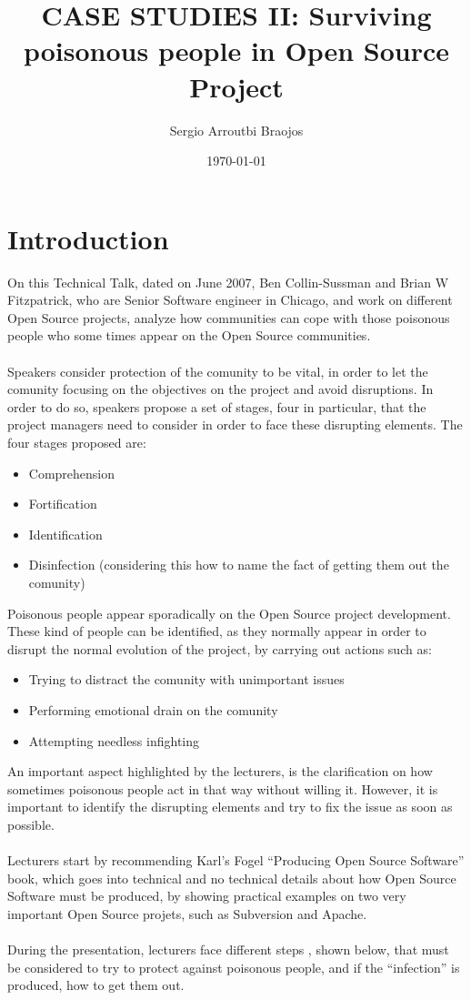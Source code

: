 \documentclass[11pt]{article}
\title{\textbf{CASE STUDIES II: Surviving poisonous people in Open Source Project}}
\author{Sergio Arroutbi Braojos}
\date{\today}
\begin{document}
\maketitle

\section{Introduction}
On this Technical Talk, dated on June 2007, Ben Collin-Sussman and Brian W Fitzpatrick, who are Senior Software engineer in Chicago, and work on different Open Source projects, analyze how communities can cope with those poisonous people who some times appear on the Open Source communities.\\
\\
Speakers consider protection of the comunity to be vital, in order to let the comunity focusing on the objectives on the project and avoid disruptions.
In order to do so, speakers propose a set of stages, four in particular, that the project managers need to consider in order to face these disrupting elements. The four stages proposed are:
\begin{itemize}\itemsep0pt
\item{Comprehension}
\item{Fortification}
\item{Identification}
\item{Disinfection (considering this how to name the fact of getting them out the comunity)}
\end{itemize}

Poisonous people appear sporadically on the Open Source project development. These kind of people can be identified, as they normally appear in order to disrupt the normal evolution of the project, by carrying out actions such as:
\begin{itemize}\itemsep0pt
\item{Trying to distract the comunity with unimportant issues}
\item{Performing emotional drain on the comunity}
\item{Attempting needless infighting}
\end{itemize}
An important aspect highlighted by the lecturers, is the clarification on how sometimes poisonous people act in that way without willing it. However, it is important to identify the disrupting elements and try to fix the issue as soon as possible.\\
\\
Lecturers start by recommending Karl's Fogel ``Producing Open Source Software'' book, which goes into technical and no technical details about how Open Source Software must be produced, by showing practical examples on two very important Open Source projets, such as Subversion and Apache.\\
\\
During the presentation, lecturers face different steps , shown below, that must be considered to try to protect against poisonous people, and if the ``infection'' is produced, how to get them out.\\
\end{document}
